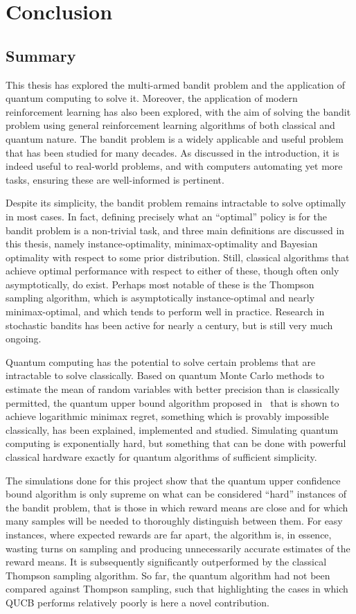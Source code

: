 \chapter{Conclusion}
\label{chap:final}

\section{Summary}
This thesis has explored the multi-armed bandit problem and the application of quantum computing to solve it.
Moreover, the application of modern reinforcement learning has also been explored, with the aim of solving the bandit problem using general reinforcement learning algorithms of both classical and quantum nature.
The bandit problem is a widely applicable and useful problem that has been studied for many decades.
As discussed in the introduction, it is indeed useful to real-world problems, and with computers automating yet more tasks, ensuring these are well-informed is pertinent.

Despite its simplicity, the bandit problem remains intractable to solve optimally in most cases.
In fact, defining precisely what an \enquote{optimal} policy is for the bandit problem is a non-trivial task, and three main definitions are discussed in this thesis, namely instance-optimality, minimax-optimality and Bayesian optimality with respect to some prior distribution.
Still, classical algorithms that achieve optimal performance with respect to either of these, though often only asymptotically, do exist.
Perhaps most notable of these is the Thompson sampling algorithm, which is asymptotically instance-optimal and nearly minimax-optimal, and which tends to perform well in practice.
Research in stochastic bandits has been active for nearly a century, but is still very much ongoing.

Quantum computing has the potential to solve certain problems that are intractable to solve classically.
Based on quantum Monte Carlo methods to estimate the mean of random variables with better precision than is classically permitted, the quantum upper bound algorithm proposed in~\autocite{wan2022} that is shown to achieve logarithmic minimax regret, something which is provably impossible classically, has been explained, implemented and studied.
Simulating quantum computing is exponentially hard, but something that can be done with powerful classical hardware exactly for quantum algorithms of sufficient simplicity.

The simulations done for this project show that the quantum upper confidence bound algorithm is only supreme on what can be considered \enquote{hard} instances of the bandit problem, that is those in which reward means are close and for which many samples will be needed to thoroughly distinguish between them.
For easy instances, where expected rewards are far apart, the algorithm is, in essence, wasting turns on sampling and producing unnecessarily accurate estimates of the reward means.
It is subsequently significantly outperformed by the classical Thompson sampling algorithm.
So far, the quantum algorithm had not been compared against Thompson sampling, such that highlighting the cases in which QUCB performs relatively poorly is here a novel contribution.

